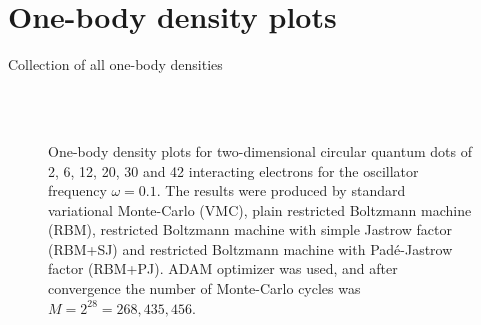 \section{One-body density plots} \label{sec:onebody}
Collection of all one-body densities
\begin{figure}[H]
	\centering
	\\
	
	\\
	
	
	\caption{One-body density plots for two-dimensional circular quantum dots of 2, 6, 12, 20, 30 and 42 interacting electrons for the oscillator frequency $\omega=0.1$. The results were produced by standard variational Monte-Carlo (VMC), plain restricted Boltzmann machine (RBM), restricted Boltzmann machine with simple Jastrow factor (RBM+SJ) and restricted Boltzmann machine with Padé-Jastrow factor (RBM+PJ). ADAM optimizer was used, and after convergence the number of Monte-Carlo cycles was $M=2^{28}=268,435,456$.}%
	\label{fig:OB_interaction_2D_0p1w}
\end{figure}
